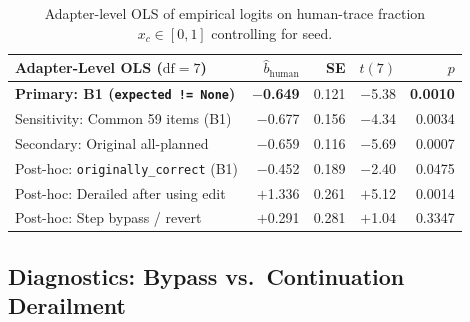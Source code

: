\documentclass[11pt]{article}
\begin{document}
\begin{table}[t]
\centering
\scriptsize
\setlength{\tabcolsep}{3.2pt}
\begin{tabular}{@{}lrrrr@{}}
\toprule
\textbf{Adapter-Level OLS ($\text{df}=7$)} & $\hat b_{\text{human}}$ & \textbf{SE} & $t(7)$ & $p$ \\
\midrule
\textbf{Primary: B1 (\texttt{expected != None})} & \textbf{$-$0.649} & 0.121 & $-$5.38 & \textbf{0.0010} \\
Sensitivity: Common 59 items (B1) & $-$0.677 & 0.156 & $-$4.34 & 0.0034 \\
Secondary: Original all-planned & $-$0.659 & 0.116 & $-$5.69 & 0.0007 \\
\midrule
Post-hoc: \texttt{originally\_correct} (B1) & $-$0.452 & 0.189 & $-$2.40 & 0.0475 \\
Post-hoc: Derailed after using edit & $+$1.336 & 0.261 & $+$5.12 & 0.0014 \\
Post-hoc: Step bypass / revert & $+$0.291 & 0.281 & $+$1.04 & 0.3347 \\
\bottomrule
\end{tabular}
\caption{Adapter-level OLS of empirical logits on human-trace fraction $x_c \in [0,1]$ controlling for seed.}
\label{tab:h4_ols}
\end{table}

\subsection{Diagnostics: Bypass vs.\ Continuation Derailment}
\end{document}
